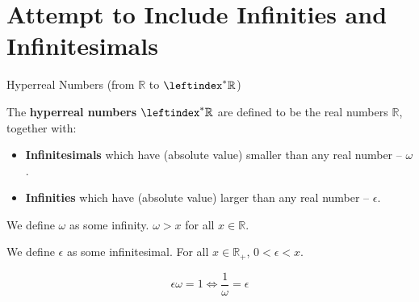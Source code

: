 \documentclass{beamer}
\newcommand{\ls}{\leftindex^*}
\newcommand{\RR}{\mathbb{R}}
\newcommand{\HR}{\ls{\RR}}
\newenvironment{remark}{
    \setbeamercolor{block title}{bg=orange!20, fg=orange}
    \begin{block}{Remark}}{\end{block}}
\begin{document}

\section{Attempt to Include Infinities and Infinitesimals}





\begin{frame}{Hyperreal Numbers (from \(\RR\) to \(\HR\))}\pause
    \begin{definition}
        The \textbf{hyperreal numbers} \(\HR\) are defined to be the real numbers \(\RR\), together with:\pause
        \begin{itemize}
            \item \textbf{Infinitesimals} which have (absolute value) smaller than any real number -- \(\omega\).\pause
            \item \textbf{Infinities} which have (absolute value) larger than any real number -- \(\epsilon\).\pause
        \end{itemize}
        We define \(\omega\) as some infinity. \(\omega > x\) for all \(x \in \RR\).\pause

        We define \(\epsilon\) as some infinitesimal. For all \(x \in \RR_{+}\), \(0 < \epsilon < x\).\pause

        \[
            \epsilon \omega = 1 \iff \frac{1}{\omega} = \epsilon
        \]
    \end{definition}
\end{frame}
\end{document}
